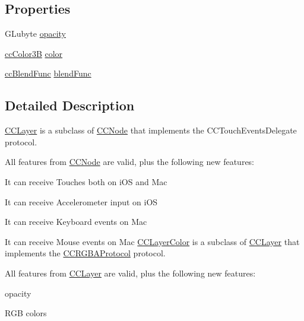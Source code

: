 \subsection*{Properties}
\begin{DoxyCompactItemize}
\item 
G\-Lubyte \hyperlink{interface_c_c_layer_color_ad4f7cd76888fe08a03c5b2c540c0d781}{opacity}
\item 
\hyperlink{cc_types_8h_a829b00c53e72f0115e3880cb508fec1e}{cc\-Color3\-B} \hyperlink{interface_c_c_layer_color_ae3a34640db3336f78de9948081de990c}{color}
\item 
\hyperlink{cc_types_8h_a8c19c6f67219ecc0a6e4740cc046008d}{cc\-Blend\-Func} \hyperlink{interface_c_c_layer_color_a69f3fcf8b7afb0a9c0b0ae10dac690f1}{blend\-Func}
\end{DoxyCompactItemize}


\subsection{Detailed Description}
\hyperlink{class_c_c_layer}{C\-C\-Layer} is a subclass of \hyperlink{class_c_c_node}{C\-C\-Node} that implements the C\-C\-Touch\-Events\-Delegate protocol.

All features from \hyperlink{class_c_c_node}{C\-C\-Node} are valid, plus the following new features\-:
\begin{DoxyItemize}
\item It can receive Touches both on i\-O\-S and Mac
\item It can receive Accelerometer input on i\-O\-S
\item It can receive Keyboard events on Mac
\item It can receive Mouse events on Mac \hyperlink{interface_c_c_layer_color}{C\-C\-Layer\-Color} is a subclass of \hyperlink{class_c_c_layer}{C\-C\-Layer} that implements the \hyperlink{protocol_c_c_r_g_b_a_protocol-p}{C\-C\-R\-G\-B\-A\-Protocol} protocol.
\end{DoxyItemize}

All features from \hyperlink{class_c_c_layer}{C\-C\-Layer} are valid, plus the following new features\-:
\begin{DoxyItemize}
\item opacity
\item R\-G\-B colors 
\end{DoxyItemize}

